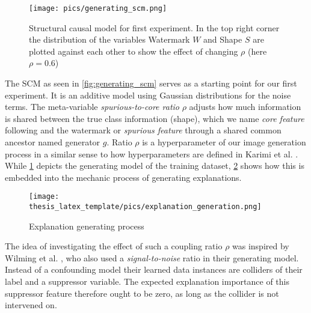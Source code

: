 \begin{figure}[H]
    \centering
    \texttt{[image: pics/generating\_scm.png]}
    \caption{Structural causal model for first experiment.
        In the top right corner the distribution of the variables Watermark $W$ and Shape $S$ are plotted against each other to show the effect of changing $\rho$ (here $\rho = 0.6$)}
    \label{fig:generating_scm}
\end{figure}

The SCM as seen in \autoref{fig:generating_scm} serves as a starting point for our first experiment. It is an additive model using Gaussian distributions for the noise terms.  The meta-variable \textit{spurious-to-core ratio} $\rho$ adjusts how much information is shared between the true class information (shape), which we name \textit{core feature} following \cite{Singla2022} and the watermark or \textit{spurious feature} through a shared common ancestor named generator $g$. Ratio $\rho$ is a hyperparameter of our image generation process in a similar sense to how hyperparameters are defined in Karimi et al. \cite{Karimi2023}. While \cref{fig:generating_scm} depicts the generating model of the training dataset, \cref{fig:egp} shows how this is embedded into the mechanic process of generating explanations. 

\begin{figure}
    \centering
    \texttt{[image: thesis\_latex\_template/pics/explanation\_generation.png]}
    \caption{Explanation generating process}\label{fig:egp}
\end{figure}

The idea of investigating the effect of such a coupling ratio $\rho$ was inspired by Wilming et al. \cite{Wilming2023}, who also used a \textit{signal-to-noise} ratio in their generating model. Instead of a confounding model their learned data instances are colliders of their label and a suppressor variable. The expected explanation importance of this suppressor feature therefore ought to be zero, as long as the collider is not intervened on. 

